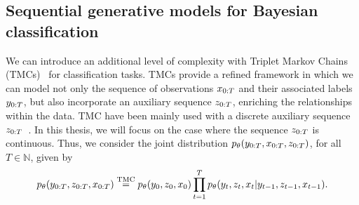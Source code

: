 




\subsection{Sequential generative models for Bayesian classification}
\label{sec:seq_gen_models}
We can introduce an additional level of complexity with Triplet Markov Chains 
(TMCs)~\citep{wp-cras-chaines3,pieczynski2005triplet}
for classification tasks. TMCs provide a refined framework in which we can model
not only the sequence of observations $x_{0:T}$ and their associated labels
$y_{0:T}$, but also incorporate an auxiliary sequence $z_{0:T}$, 
enriching the relationships within the data.
TMC  have been mainly used
with a discrete  auxiliary sequence $z_{0:T}$~\citep{gorynin2018assessing,
lanchantin2008unsupervised,pieczynski2007multisensor}.
In this thesis, we will focus on the case where the sequence $z_{0:T}$ is continuous.
Thus, we consider the joint distribution $p_{\theta}(y_{0:T}, x_{0:T}, z_{0:T})$,
for all $T \in \mathbb{N}$, given by
\begin{equation}
    \label{eq:tmc_intro}
    \p(\lab_{0:T}, \latent_{0:T}, \obs_{0:T} ) \overset{\text{TMC}}{=} 
    \p(\lab_0,  \latent_0, \obs_0) \prod_{t=1}^{T}  \p(\lab_{t}, 
    \latent_{t}, \obs_{t} |\lab_{t-1}, \latent_{t-1}, \obs_{t-1})
    \text{.}%
\end{equation}

